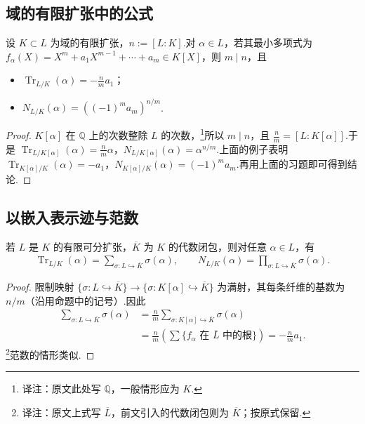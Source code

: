 \subsection{域的有限扩张中的公式}\label{sec:nt-2-3-2}
\begin{proposition*}
设 $K\subset L$ 为域的有限扩张，$n:=[L:K]$.对 $\alpha\in L$，若其最小多项式为 $f_\alpha(X)=X^m+a_1X^{m-1}+\cdots+a_m\in K[X]$，则 $m\mid n$，且
\begin{itemize}
\item $\operatorname{Tr}_{L/K}(\alpha)=-\frac nm a_1$；
\item $N_{L/K}(\alpha)=((-1)^ma_m)^{n/m}$.
\end{itemize}
\end{proposition*}
\begin{proof}
$K[\alpha]$ 在 $\mathbb Q$ 上的次数整除 $L$ 的次数，\footnote{译注：原文此处写 $\mathbb Q$，一般情形应为 $K$.}所以 $m\mid n$，且 $\frac nm=[L:K[\alpha]]$.于是 $\operatorname{Tr}_{L/K[\alpha]}(\alpha)=\frac nm\alpha$，$N_{L/K[\alpha]}(\alpha)=\alpha^{n/m}$.上面的例子表明 $\operatorname{Tr}_{K[\alpha]/K}(\alpha)=-a_1$，$N_{K[\alpha]/K}(\alpha)=(-1)^ma_m$.再用上面的习题即可得到结论.
\end{proof}

\subsection{以嵌入表示迹与范数}\label{sec:nt-2-3-3}
\begin{corollary*}
若 $L$ 是 $K$ 的有限可分扩张，$\overline K$ 为 $K$ 的代数闭包，则对任意 $\alpha\in L$，有
\begin{align*}
\operatorname{Tr}_{L/K}(\alpha)=\sum_{\sigma:L\hookrightarrow\overline K}\sigma(\alpha),\qquad
N_{L/K}(\alpha)=\prod_{\sigma:L\hookrightarrow\overline K}\sigma(\alpha).
\end{align*}
\end{corollary*}
\begin{proof}
限制映射 $\{\sigma:L\hookrightarrow\overline K\}\longrightarrow\{\sigma:K[\alpha]\hookrightarrow\overline K\}$ 为满射，其每条纤维的基数为 $n/m$（沿用命题中的记号）.因此
\begin{align*}
\sum_{\sigma:L\hookrightarrow\overline K}\sigma(\alpha)
&=\frac nm\sum_{\sigma:K[\alpha]\hookrightarrow\overline K}\sigma(\alpha)\\
&=\frac nm\left(\sum\{f_\alpha\text{ 在 }\overline L\text{ 中的根}\}\right)=-\frac nm a_1.
\end{align*}
\footnote{译注：原文上式写 $\overline L$，前文引入的代数闭包则为 $\overline K$；按原式保留.}范数的情形类似.
\end{proof}

